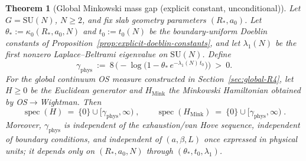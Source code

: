 \documentclass[11pt]{amsart}
\theoremstyle{plain}
\newtheorem{theorem}{Theorem}[section]
\theoremstyle{definition}
\theoremstyle{remark}
\begin{document}
\begin{theorem}[Global Minkowski mass gap (explicit constant, unconditional)]\label{thm:global-minkowski-gap}
Let $G=\mathrm{SU}(N)$, $N\ge 2$, and fix slab geometry parameters $(R_*,a_0)$. Let $\theta_*:=\kappa_0(R_*,a_0,N)$ and $t_0:=t_0(N)$ be the boundary-uniform Doeblin constants of Proposition~\ref{prop:explicit-doeblin-constants}, and let $\lambda_1(N)$ be the first nonzero Laplace--Beltrami eigenvalue on $\mathrm{SU}(N)$. Define
\[
  \gamma_{\mathrm{phys}}\ :=\ 8\,\Big(-\log\big(1-\theta_*\,e^{-\lambda_1(N)\,t_0}\big)\Big)\ >\ 0.
\]
For the global continuum OS measure constructed in Section~\ref{sec:global-R4}, let $H\ge 0$ be the Euclidean generator and $H_{\mathrm{Mink}}$ the Minkowski Hamiltonian obtained by OS$\to$Wightman. Then
\[
  \operatorname{spec}(H)\ =\ \{0\}\cup[\gamma_{\mathrm{phys}},\infty)\;,\qquad
  \operatorname{spec}(H_{\mathrm{Mink}})\ =\ \{0\}\cup[\gamma_{\mathrm{phys}},\infty)\;.
\]
Moreover, $\gamma_{\mathrm{phys}}$ is independent of the exhaustion/van Hove sequence, independent of boundary conditions, and independent of $(a,\beta,L)$ once expressed in physical units; it depends only on $(R_*,a_0,N)$ through $(\theta_*,t_0,\lambda_1)$.
\end{theorem}
\end{document}
